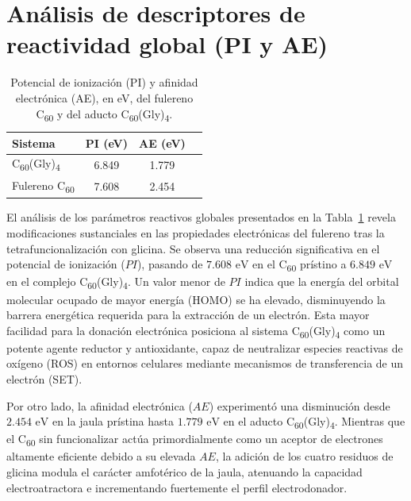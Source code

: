 \section{Análisis de descriptores de reactividad global (PI y AE)}
\begin{table}[H]
    \centering
    \caption{Potencial de ionización (PI) y afinidad electrónica (AE), en eV, del fulereno C\textsubscript{60} y del aducto C\textsubscript{60}(Gly)\textsubscript{4}.}
    \label{tab:energias-referencia}
    \renewcommand{\arraystretch}{1.15}
    \begin{tabular}{lccc}
        \toprule
        \textbf{Sistema} & \textbf{PI (eV)} & \textbf{AE (eV)}\\
        \midrule
         C\textsubscript{60}(Gly)\textsubscript{4} & 6.849
 & 1.779 \\
        Fulereno  C\textsubscript{60} & 7.608
 & 2.454 \\
        \bottomrule
    \end{tabular}
\end{table}

El análisis de los parámetros reactivos globales presentados en la Tabla~\ref{tab:energias-referencia} revela modificaciones sustanciales en las propiedades electrónicas del fulereno tras la tetrafuncionalización con glicina. Se observa una reducción significativa en el potencial de ionización ($PI$), pasando de $7.608\text{ eV}$ en el C\textsubscript{60} prístino a $6.849\text{ eV}$ en el complejo C\textsubscript{60}(Gly)\textsubscript{4}. Un valor menor de $PI$ indica que la energía del orbital molecular ocupado de mayor energía (HOMO) se ha elevado, disminuyendo la barrera energética requerida para la extracción de un electrón. Esta mayor facilidad para la donación electrónica posiciona al sistema C\textsubscript{60}(Gly)\textsubscript{4} como un potente agente reductor y antioxidante, capaz de neutralizar especies reactivas de oxígeno (ROS) en entornos celulares mediante mecanismos de transferencia de un electrón (SET).

Por otro lado, la afinidad electrónica ($AE$) experimentó una disminución desde $2.454\text{ eV}$ en la jaula prístina hasta $1.779\text{ eV}$ en el aducto C\textsubscript{60}(Gly)\textsubscript{4}. Mientras que el C\textsubscript{60} sin funcionalizar actúa primordialmente como un aceptor de electrones altamente eficiente debido a su elevada $AE$, la adición de los cuatro residuos de glicina modula el carácter amfotérico de la jaula, atenuando la capacidad electroatractora e incrementando fuertemente el perfil electrodonador.

